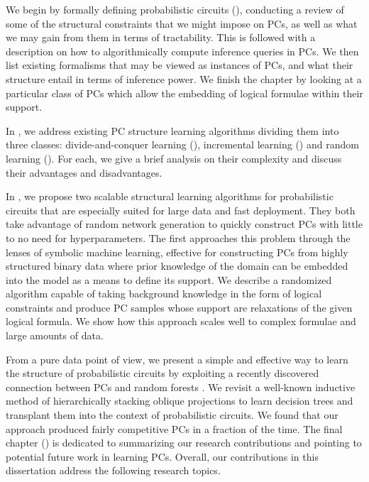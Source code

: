 We begin  by formally defining probabilistic circuits (), conducting a
review of some of the structural constraints that we might impose on PCs, as well as what we may
gain from them in terms of tractability. This is followed with a description on how to
algorithmically compute inference queries in PCs. We then list existing formalisms that may be
viewed as instances of PCs, and what their structure entail in terms of inference power. We finish
the chapter by looking at a particular class of PCs which allow the embedding of logical formulae
within their support.

In , we address existing PC structure learning algorithms dividing them into
three classes: divide-and-conquer learning (), incremental learning
() and random learning (). For each, we give a brief
analysis on their complexity and discuss their advantages and disadvantages.

In , we propose two scalable structural learning algorithms for probabilistic
circuits that are especially suited for large data and fast deployment. They both take advantage of
random network generation to quickly construct PCs with little to no need for hyperparameters. The
first approaches this problem through the lenses of symbolic machine learning, effective for
constructing PCs from highly structured binary data where prior knowledge of the domain can be
embedded into the model as a means to define its support. We describe a randomized algorithm
capable of taking background knowledge in the form of logical constraints and produce PC samples
whose support are relaxations of the given logical formula. We show how this approach scales well
to complex formulae and large amounts of data.

From a pure data point of view, we present a simple and effective way to learn the structure of
probabilistic circuits by exploiting a recently discovered connection between PCs and random
forests \citep{correia20}. We revisit a well-known inductive method of hierarchically stacking
oblique projections to learn decision trees \citep{dasgupta08a,dasgupta08b} and transplant them
into the context of probabilistic circuits. We found that our approach produced fairly competitive
PCs in a fraction of the time. The final chapter () is dedicated to summarizing
our research contributions and pointing to potential future work in learning PCs. Overall, our
contributions in this dissertation address the following research topics.

